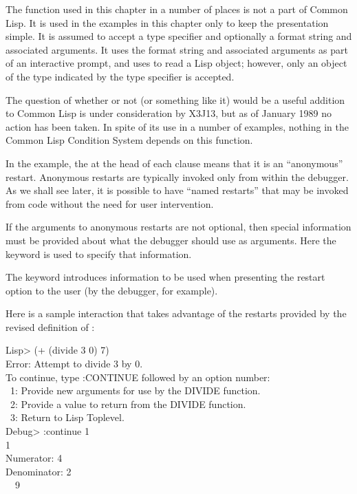 \beforenoterule
\begin{sideremark}
    The function  used in this chapter in a number of places is
    not a part of Common Lisp.  It is used in the examples in this chapter only to keep
    the presentation simple.  It is assumed to accept a type specifier
     and optionally a format string and associated arguments.  It uses the
    format string and associated arguments as part of an interactive prompt,
    and uses  to read a Lisp object; however, only an object of the
    type indicated by the type specifier is accepted.

    The question of whether or not  (or something like it) would be a
    useful addition to Common Lisp is under consideration by X3J13, but as of
    January 1989 no action has been taken. In spite of its use in a number of examples,
    nothing in the Common Lisp Condition System depends on this function.
\end{sideremark}
\afternoterule

In the example, the  at the head of each clause
means that it is an ``anonymous'' restart.
Anonymous restarts are typically invoked only from within the
debugger. As we shall see later, it is possible to have ``named restarts''
that may be invoked from code without the need for user intervention.

If the arguments to anonymous restarts are not optional, then special
information must be provided about what the debugger should use as arguments.
Here the  keyword is used to specify that information.

The  keyword introduces information to be used when presenting the
restart option to the user (by the debugger, for example).

Here is a sample interaction that takes advantage of the restarts provided
by the revised definition of :
\begin{lisp}
Lisp> (+ (divide 3 0) 7) \\
Error: Attempt to divide 3 by 0. \\
To continue, type :CONTINUE followed by an option number: \\
~1: Provide new arguments for use by the DIVIDE function. \\
~2: Provide a value to return from the DIVIDE function. \\
~3: Return to Lisp Toplevel. \\
Debug> :continue 1 \\
1 \\
Numerator: 4 \\
Denominator: 2 \\
~\EV\ 9
\end{lisp}

